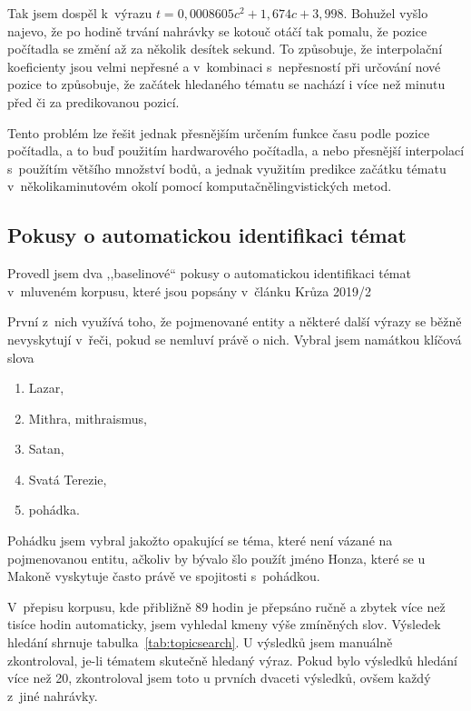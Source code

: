 Tak jsem dospěl k~výrazu $t = 0,0008605c^2 + 1,674c + 3,998$. Bohužel vyšlo
najevo, že po hodině trvání nahrávky se kotouč otáčí tak pomalu, že pozice
počítadla se změní až za několik desítek sekund. To způsobuje, že interpolační
koeficienty jsou velmi nepřesné a v~kombinaci s~nepřesností při určování nové
pozice to způsobuje, že začátek hledaného tématu se nachází i více než minutu
před či za predikovanou pozicí.

Tento problém lze řešit jednak přesnějším určením funkce času podle pozice
počítadla, a to buď použitím hardwarového počítadla, a nebo přesnější
interpolací s~použítím většího množství bodů, a jednak využitím predikce začátku
tématu v~několikaminutovém okolí pomocí komputačnělingvistických metod.

\subsection{Pokusy o automatickou identifikaci témat}

Provedl jsem dva ,,baselinové`` pokusy o automatickou identifikaci témat
v~mluveném korpusu, které jsou popsány v~článku Krůza 2019/2\cite{kruza2019spoken}

První z~nich využívá toho, že pojmenované entity a některé další výrazy se běžně
nevyskytují v~řeči, pokud se nemluví právě o nich. Vybral jsem namátkou klíčová
slova
\begin{enumerate}
\item{Lazar,}
\item{Mithra, mithraismus,}
\item{Satan,}
\item{Svatá Terezie,}
\item{pohádka.}
\end{enumerate}

Pohádku jsem vybral jakožto opakující se téma, které není vázané na pojmenovanou
entitu, ačkoliv by bývalo šlo použít jméno Honza, které se u Makoně vyskytuje
často právě ve spojitosti s~pohádkou.

V~přepisu korpusu, kde přibližně 89 hodin je
přepsáno ručně a zbytek více než tisíce hodin automaticky, jsem vyhledal kmeny
výše zmíněných slov. Výsledek hledání shrnuje tabulka~\ref{tab:topicsearch}.
U výsledků jsem manuálně zkontroloval, je-li tématem skutečně hledaný výraz.
Pokud bylo výsledků hledání více než 20, zkontroloval jsem toto u prvních
dvaceti výsledků, ovšem každý z~jiné nahrávky.

